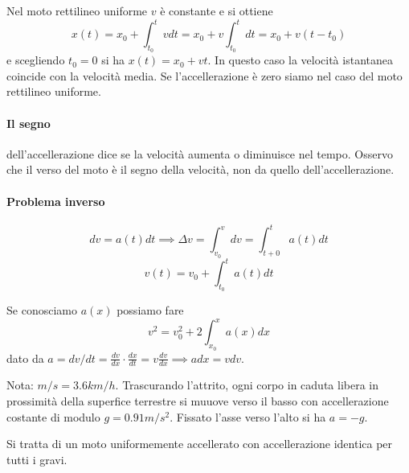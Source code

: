 Nel moto rettilineo uniforme $v$ è constante e si ottiene \[x(t)=x_0+\int_{t_0}^{t}vdt=x_0+v\int_{t_0}^{t}dt=x_0+v(t-t_0)\] e scegliendo $t_0=0$ si ha $x(t)=x_0+vt$. In questo caso la velocità istantanea coincide con la velocità media.
Se l'accellerazione è zero siamo nel caso del moto rettilineo uniforme.
\paragraph{Il segno} dell'accellerazione dice se la velocità aumenta o diminuisce nel tempo.
Osservo che il verso del moto è il segno della velocità, non da quello dell'accellerazione.

\paragraph{Problema inverso} \[dv=a(t)dt\implies \Delta v = \int_{v_0}^{v}dv=\int_{t+0}^{t}a(t)dt\]\[v(t)=v_0+\int_{t_0}^{t}a(t)dt\]

Se conosciamo $a(x)$ possiamo fare \[v^2=v_0^2+2\int_{x_0}^{x}a(x)dx\] dato da $a=dv/dt=\frac{dv}{dx}\cdot\frac{dx}{dt}=v\frac{dv}{dx}\implies adx=vdv$.

Nota: $m/s=3.6km/h$.
Trascurando l'attrito, ogni corpo in caduta libera in prossimità della superfice terrestre si muuove verso il basso con accellerazione costante di modulo $g=0.91m/s^2$.
Fissato l'asse verso l'alto si ha $a=-g$.

Si tratta di un moto uniformemente accellerato con accellerazione identica per tutti i gravi.

